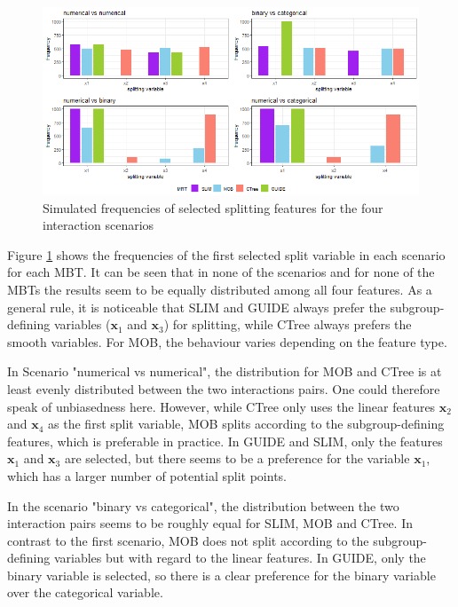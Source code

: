 \begin{figure}[!htb]
    \centering   
    \includegraphics[width = 16cm]{Figures/simulations/chapter_4_selection_bias/selection_bias_general/interactions.png}
    \caption{Simulated frequencies of selected splitting features for the four interaction scenarios}
    \label{fig:selection_bias_interactions}
\end{figure}

Figure \ref{fig:selection_bias_interactions} shows the frequencies of the first selected split variable in each scenario for each MBT. It can be seen that in none of the scenarios and for none of the MBTs the results seem to be equally distributed among all four features. 
As a general rule, it is noticeable that SLIM and GUIDE always prefer the subgroup-defining variables ($\textbf{x}_1$  and $\textbf{x}_3$) for splitting, while CTree always prefers the smooth variables. For MOB, the behaviour varies depending on the feature type.

In Scenario "numerical vs numerical", the distribution for MOB and CTree is at least evenly distributed between the two interactions pairs. One could therefore speak of unbiasedness here. However, while CTree only uses the linear features $\textbf{x}_2$ and $\textbf{x}_4$ as the first split variable, MOB splits according to the subgroup-defining features, which is preferable in practice.
In GUIDE and SLIM, only the features $\textbf{x}_1$ and $\textbf{x}_3$ are selected, but there seems to be a preference for the variable $\textbf{x}_1$, which has a larger number of potential split points.


In the scenario "binary vs categorical", the distribution between the two interaction pairs seems to be roughly equal for SLIM, MOB and CTree. In contrast to the first scenario, MOB does not split according to the subgroup-defining variables but with regard to the linear features.
In GUIDE, only the binary variable is selected, so there is a clear preference for the binary variable over the categorical variable.

